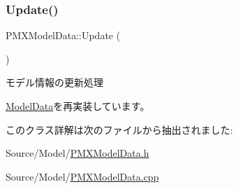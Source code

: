 \subsubsection{\texorpdfstring{Update()}{Update()}}
{\footnotesize\ttfamily P\+M\+X\+Model\+Data\+::\+Update (\begin{DoxyParamCaption}{ }\end{DoxyParamCaption})\hspace{0.3cm}{\ttfamily [virtual]}}

モデル情報の更新処理 

\mbox{\hyperlink{class_model_data_a67a18789221798611c63fd18edb3a9fc}{Model\+Data}}を再実装しています。



このクラス詳解は次のファイルから抽出されました\+:\begin{DoxyCompactItemize}
\item 
Source/\+Model/\mbox{\hyperlink{_p_m_x_model_data_8h}{P\+M\+X\+Model\+Data.\+h}}\item 
Source/\+Model/\mbox{\hyperlink{_p_m_x_model_data_8cpp}{P\+M\+X\+Model\+Data.\+cpp}}\end{DoxyCompactItemize}
